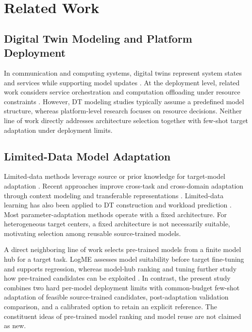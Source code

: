 \documentclass[a4paper,fleqn]{cas-sc}
\begin{document}
\section{Related Work}
\label{sec:related}

\subsection{Digital Twin Modeling and Platform Deployment}

In communication and computing systems, digital twins represent system states
and services while supporting model updates \cite{ref5,ref6,ref7,ref8}.
At the deployment level, related work considers service orchestration and
computation offloading under resource constraints \cite{ref27,ref28}.
However, DT modeling studies typically assume a predefined model structure,
whereas platform-level research focuses on resource decisions. Neither line of work directly addresses architecture selection together with
few-shot target adaptation under deployment limits.

\subsection{Limited-Data Model Adaptation}

Limited-data methods leverage source or prior knowledge for target-model
adaptation \cite{ref9,ref10,ref24}. Recent approaches improve cross-task and
cross-domain adaptation through context modeling and transferable
representations \cite{ref20,ref21,ref22,ref23}. Limited-data learning has also
been applied to DT construction and workload prediction \cite{ref11,ref25}.
Most parameter-adaptation methods operate with a fixed architecture. For
heterogeneous target centers, a fixed architecture is not necessarily suitable,
motivating selection among reusable source-trained models.

A direct neighboring line of work selects pre-trained models from a finite
model hub for a target task. LogME assesses model suitability before
target fine-tuning and supports regression, whereas model-hub ranking and
tuning further study how pre-trained candidates can be exploited
\cite{ref35,ref36}. In contrast, the present study combines two hard
per-model deployment limits with common-budget few-shot adaptation of
feasible source-trained candidates, post-adaptation validation comparison,
and a calibrated option to retain an explicit reference. The constituent
ideas of pre-trained model ranking and model reuse are not claimed as new.
\end{document}
